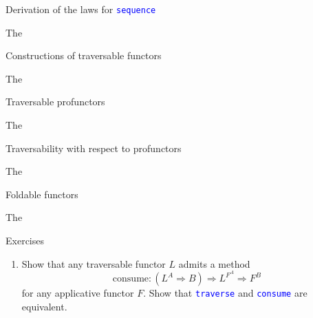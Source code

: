 \documentclass[english]{beamer}
\begin{document}
\begin{frame}{Derivation of the laws for \texttt{\textcolor{blue}{\footnotesize{}sequence}} }

\vspace{-0.15cm}The
\end{frame}

\begin{frame}{Constructions of traversable functors}

\vspace{-0.15cm}The 
\end{frame}

\begin{frame}{Traversable profunctors}

\vspace{-0.15cm}The
\end{frame}

\begin{frame}{Traversability with respect to profunctors}

\vspace{-0.15cm}The
\end{frame}

\begin{frame}{Foldable functors}

\vspace{-0.15cm}The 
\end{frame}

\begin{frame}{Exercises}
\begin{enumerate}
\item {\footnotesize{}\vspace{-0.15cm}Show that any traversable functor
$L$ admits a method 
\[
\text{consume}:(L^{A}\Rightarrow B)\Rightarrow L^{F^{A}}\Rightarrow F^{B}
\]
for any applicative functor $F$. Show that }\texttt{\textcolor{blue}{\footnotesize{}traverse}}{\footnotesize{}
and }\texttt{\textcolor{blue}{\footnotesize{}consume}}{\footnotesize{}
are equivalent.}{\footnotesize \par}
\end{enumerate}
\end{frame}
\end{document}
